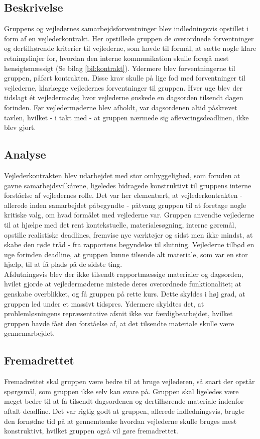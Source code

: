 \subsection{Beskrivelse}
Gruppens og vejledernes samarbejdsforventninger blev indledningsvis opstillet i form af en vejlederkontrakt. Her opstillede gruppen de overordnede forventninger og dertilhørende kriterier til vejlederne, som havde til formål, at sætte nogle klare retningslinjer for, hvordan den interne kommunikation skulle foregå mest hensigtsmæssigt (Se bilag \ref{bil:kontrakt}). Ydermere blev forventningerne til gruppen, påført kontrakten. Disse krav skulle på lige fod med forventninger til vejlederne, klarlægge vejledernes forventninger til gruppen. Hver uge blev der tidslagt ét vejledermøde; hvor vejlederne ønskede en dagsorden tilsendt dagen forinden. Før vejledermøderne blev afholdt, var dagsordenen altid påskrevet tavlen, hvilket - i takt med - at gruppen nærmede sig afleveringsdeadlinen, ikke blev gjort. \\

\subsection{Analyse}
Vejlederkontrakten blev udarbejdet med stor omhyggelighed, som foruden at gavne samarbejdsvilkårene, ligeledes bidragede konstruktivt til gruppens interne forståelse af vejledernes rolle. Det var her elementært, at vejlederkontrakten - allerede inden samarbejdet påbegyndte - påtvang gruppen til at foretage nogle kritiske valg, om hvad formålet med vejlederne var. Gruppen anvendte vejlederne til at hjælpe med det rent kontekstuelle, materialesøgning, interne gøremål, opstille realistiske deadlines, fremvise nye værktøjer og sidst men ikke mindst, at skabe den røde tråd - fra rapportens begyndelse til slutning. Vejlederne tilbød en uge forinden deadline, at gruppen kunne tilsende alt materiale, som var en stor hjælp, til at få plads på de sidste ting. \\ 

Afslutningsvis blev der ikke tilsendt rapportmæssige materialer og dagsorden, hvilet gjorde at vejledermøderne mistede deres overordnede funktionalitet; at genskabe overblikket, og få gruppen på rette kurs. Dette skyldes i høj grad, at gruppen led under et massivt tidspres. Ydermere skyldtes det, at problemløsningens repræsentative afsnit ikke var færdigbearbejdet, hvilket gruppen havde fået den forståelse af, at det tilsendte materiale skulle være gennemarbejdet. \\

\subsection{Fremadrettet}
Fremadrettet skal gruppen være bedre til at bruge vejlederen, så snart der opstår spørgsmål, som gruppen ikke selv kan svare på. Gruppen skal ligeledes være meget bedre til at få tilsendt dagsordenen og dertilhørende materiale indenfor aftalt deadline. Det var rigtig godt at gruppen, allerede indledningsvis, brugte den fornødne tid på at gennemtænke hvordan vejlederne skulle bruges mest konstruktivt, hvilket gruppen også vil gøre fremadrettet.
